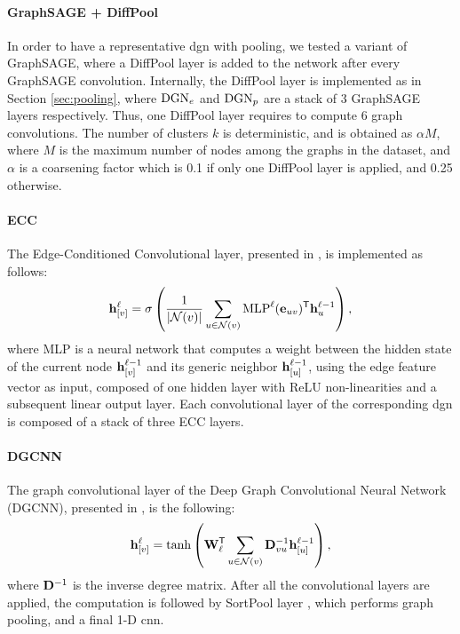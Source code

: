 \paragraph{GraphSAGE + DiffPool} 
In order to have a representative \gls{dgn} with pooling, we tested a variant of GraphSAGE, where a DiffPool layer is added to the network after every GraphSAGE convolution. Internally, the DiffPool layer is implemented as in Section \ref{sec:pooling}, where $\mathrm{DGN}_e$ and $\mathrm{DGN}_p$ are a stack of 3 GraphSAGE layers respectively. Thus, one DiffPool layer requires to compute 6 graph convolutions. The number of clusters $k$ is deterministic, and is obtained as $\alpha M$, where $M$ is the maximum number of nodes among the graphs in the dataset, and $\alpha$ is a coarsening factor which is 0.1 if only one DiffPool layer is applied, and 0.25 otherwise.

\paragraph{ECC}
The Edge-Conditioned Convolutional layer, presented in \cite{?}, is implemented as follows:
$$\Elem{h}{v}^{\ell} = \sigma\Paren{ \frac{1}{|\Cal{N}(v)|}\sum_{u \in \Cal{N}(v)} \Fun{MLP}^{\ell}(\Vector{e}_{uv})^{\Transpose} \mathbf{h}_u^{\ell-1}},$$
where MLP is a neural network that computes a weight between the hidden state of the current node $\Elem{h}{v}^{\ell-1}$ and its generic neighbor $\Elem{h}{u}^{\ell-1}$, using the edge feature vector as input, composed of one hidden layer with ReLU non-linearities and a subsequent linear output layer. Each convolutional layer of the corresponding \gls{dgn} is composed of a stack of three ECC layers.

\paragraph{DGCNN}
The graph convolutional layer of the Deep Graph Convolutional Neural Network (DGCNN), presented in \cite{?}, is the following:
$$\Elem{h}{v}^{\ell} = \Fun{tanh} \Paren{\Matrix{W}_{\ell}^{\Transpose} \sum_{u \in \mathcal{N}(v)} \Matrix{D}^{-1}_{vu}\Elem{h}{u}^{\ell-1}},$$
where $\Matrix{D}^{-1}$ is the inverse degree matrix. After all the convolutional layers are applied, the computation is followed by SortPool layer \cite{?}, which performs graph pooling, and a final 1-D \gls{cnn}.

